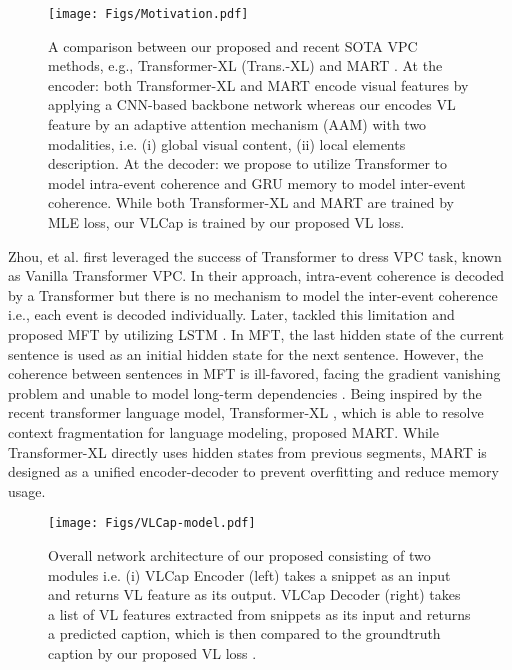 \documentclass{article}
\begin{document}
\begin{figure}[!t]
    \centering
    \texttt{[image: Figs/Motivation.pdf]}
    \vspace{-3mm}
    \caption{A comparison between our proposed \model and recent SOTA VPC methods, e.g., Transformer-XL (Trans.-XL) \cite{dai2019transformer} and MART \cite{lei2020mart}. At the encoder: both Transformer-XL and MART encode visual features by applying a CNN-based backbone network whereas our \model encodes VL feature by an adaptive attention mechanism (AAM) \cite{vo2021aei} with two modalities, i.e. (i) global visual content, (ii) local elements description. At the decoder: we propose to utilize Transformer to model intra-event coherence and GRU memory to model inter-event coherence. While both  Transformer-XL and MART are trained by MLE loss, our VLCap is trained by our proposed VL loss. \vspace{-5mm}
    }
    \label{fig:compare_model}
\end{figure}

Zhou, et al. \cite{zhou2018end} first leveraged the success of Transformer \cite{vaswani2017attention} to dress VPC task, known as Vanilla Transformer VPC. In their approach, intra-event coherence is decoded by a Transformer but there is no mechanism to model the inter-event coherence i.e., each event is decoded individually. Later, \cite{xiong2018move} tackled this limitation and proposed MFT by utilizing LSTM \cite{hochreiter1997long}. In MFT, the last hidden state of the current sentence is used as an initial hidden state for the next sentence. However, the coherence between sentences in MFT is ill-favored, facing the gradient vanishing problem \cite{pascanu2013difficulty} and unable to model long-term dependencies \cite{hochreiter2001gradient}. Being inspired by the recent transformer language model, Transformer-XL \cite{dai2019transformer}, which is able to resolve context fragmentation for language modeling, \cite{lei2020mart} proposed MART. While Transformer-XL directly uses hidden states from previous segments, MART is designed as a unified encoder-decoder to prevent overfitting and reduce memory usage. 

\begin{figure*}[]
    \centering
    \texttt{[image: Figs/VLCap-model.pdf]}
    \vspace{-4mm}
    \caption{ Overall network architecture of our proposed \model consisting of two modules i.e. (i) VLCap Encoder (left) takes a snippet  as an input and returns VL feature  as its output. VLCap Decoder (right) takes a list of VL features  extracted from  snippets as its input and returns a predicted caption, which is then compared to the groundtruth caption by our proposed VL loss . \vspace{-5mm}}
    \label{fig:overall}
\end{figure*}
\end{document}
